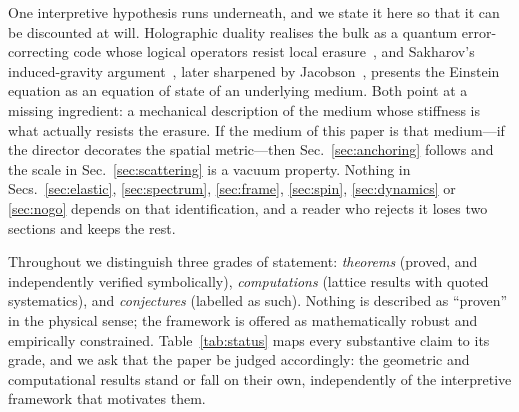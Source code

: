 \documentclass[aps,prd,preprint,nofootinbib,longbibliography]{revtex4-2}
\begin{document}
One interpretive hypothesis runs underneath, and we state it here so that it can
be discounted at will. Holographic duality realises the bulk as a quantum
error-correcting code whose logical operators resist local
erasure~\cite{almheiri2015,pastawski2015}, and Sakharov's induced-gravity
argument~\cite{sakharov1967}, later sharpened by Jacobson~\cite{jacobson1995},
presents the Einstein equation as an equation of state of an underlying medium.
Both point at a missing ingredient: a mechanical description of the medium whose
stiffness is what actually resists the erasure. If the medium of this paper is
that medium---if the director decorates the spatial metric---then
Sec.~\ref{sec:anchoring} follows and the scale in Sec.~\ref{sec:scattering} is a
vacuum property. Nothing in Secs.~\ref{sec:elastic}, \ref{sec:spectrum},
\ref{sec:frame}, \ref{sec:spin}, \ref{sec:dynamics} or \ref{sec:nogo} depends on
that identification, and a reader who rejects it loses two sections and keeps the
rest.

Throughout we distinguish three grades of statement: \emph{theorems} (proved, and
independently verified symbolically), \emph{computations} (lattice results with
quoted systematics), and \emph{conjectures} (labelled as such). Nothing is
described as ``proven'' in the physical sense; the framework is offered as
mathematically robust and empirically constrained. Table~\ref{tab:status} maps
every substantive claim to its grade, and we ask that the paper be judged
accordingly: the geometric and computational results stand or fall on their own,
independently of the interpretive framework that motivates them.
\end{document}
